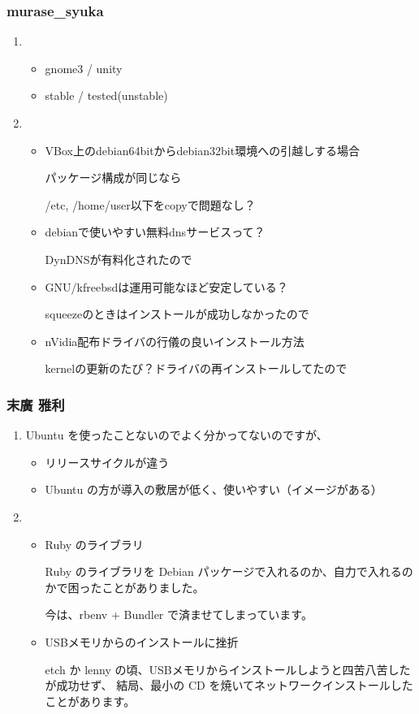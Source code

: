 \documentclass[cjk,dvipdfmx,10pt,compress,%
hyperref={bookmarks=true,bookmarksnumbered=true,bookmarksopen=false,%
colorlinks=false,%
pdftitle={第 72 回 関西 Debian 勉強会},%
pdfauthor={倉敷・のがた・佐々木・かわだ・八津尾},%
pdfsubject={資料},%
}]{beamer}
\begin{document}
\begin{frame}\frametitle{ murase\_{}syuka }
  \begin{enumerate}
  \item 
    \begin{itemize}
    \item gnome3 / unity
    \item stable / tested(unstable)
    \end{itemize}
  \item 
    \begin{itemize}
    \item VBox上のdebian64bitからdebian32bit環境への引越しする場合

      パッケージ構成が同じなら

      /etc, /home/user以下をcopyで問題なし？
    \item debianで使いやすい無料dnsサービスって？

      DynDNSが有料化されたので
    \item GNU/kfreebsdは運用可能なほど安定している？

      squeezeのときはインストールが成功しなかったので
    \item nVidia配布ドライバの行儀の良いインストール方法

      kernelの更新のたび？ドライバの再インストールしてたので
    \end{itemize}
  \end{enumerate}
\end{frame}

\begin{frame}\frametitle{ 末廣 雅利 }
  \begin{enumerate}
  \item Ubuntu を使ったことないのでよく分かってないのですが、
    \begin{itemize}
    \item リリースサイクルが違う
    \item Ubuntu の方が導入の敷居が低く、使いやすい（イメージがある）
    \end{itemize}
  \item 
    \begin{itemize}
    \item Ruby のライブラリ

      Ruby のライブラリを Debian パッケージで入れるのか、自力で入れるのかで困ったことがありました。

      今は、rbenv + Bundler で済ませてしまっています。
    \item USBメモリからのインストールに挫折

      etch か lenny の頃、USBメモリからインストールしようと四苦八苦したが成功せず、
      結局、最小の CD を焼いてネットワークインストールしたことがあります。
    \end{itemize}
  \end{enumerate}
\end{frame}
\end{document}
